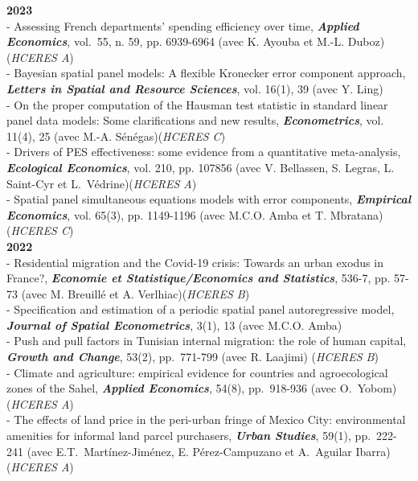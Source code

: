\documentclass[a4paper,12pt]{article}
\begin{document}
\noindent \textbf{2023}  \smallskip \\ 
- Assessing French departments' spending efficiency over time, \textit{\textbf{Applied Economics}}, vol.~55, n. 59, pp. 6939-6964 (avec K. Ayouba et M.-L. Duboz)(\textit{HCERES A}) \\
- Bayesian spatial panel models: A flexible Kronecker error component approach, \textit{\textbf{Letters in Spatial and Resource Sciences}}, vol. 16(1), 39 (avec Y. Ling) \\
- On the proper computation of the Hausman test statistic in standard linear panel data models: Some clarifications and new results, \textit{\textbf{Econometrics}}, vol. 11(4), 25 (avec M.-A. Sénégas)(\textit{HCERES C}) \\
- Drivers of PES effectiveness: some evidence from a quantitative meta-analysis, \textit{\textbf{Ecological Economics}}, vol. 210, pp. 107856 (avec V. Bellassen, S. Legras, L. Saint-Cyr et L.~Védrine)(\textit{HCERES A}) \\
- Spatial panel simultaneous equations models with error components, \textit{\textbf{Empirical Economics}}, vol. 65(3), pp. 1149-1196 (avec M.C.O. Amba et T. Mbratana)(\textit{HCERES C}) \\

\noindent \textbf{2022}  \smallskip \\ 
- Residential migration and the Covid-19 crisis: Towards an urban exodus in France?,  \textit{\textbf{Economie et Statistique/Economics and Statistics}}, 536-7, pp. 57-73 (avec M. Breuillé et A. Verlhiac)(\textit{HCERES B}) \\
- Specification and estimation of a periodic spatial panel autoregressive model, \textit{\textbf{Journal of Spatial Econometrics}}, 3(1), 13 (avec M.C.O. Amba)  \\ 
- Push and pull factors in Tunisian internal migration: the role of human capital, \textit{\textbf{Growth and Change}}, 53(2), pp.~771-799 (avec R. Laajimi) (\textit{HCERES B}) \\ 
- Climate and agriculture: empirical evidence for countries and agroecological zones of the Sahel, \textit{\textbf{Applied Economics}}, 54(8), pp.~918-936 (avec O.~Yobom)(\textit{HCERES A})\\
- The effects of land price in the peri-urban fringe of Mexico City: environmental amenities for informal land parcel purchasers, \textit{\textbf{Urban Studies}}, 59(1), pp.~222-241  (avec E.T.~Martínez-Jiménez, E. Pérez-Campuzano et A.~Aguilar Ibarra) (\textit{HCERES A}) \\ 
\end{document}
